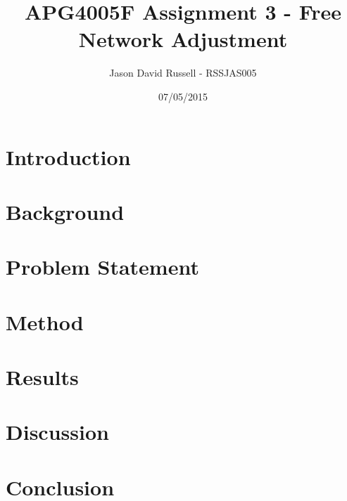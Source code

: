 \documentclass{article}
\title{APG4005F Assignment 3 - Free Network Adjustment}
\date{07/05/2015}
\author{Jason David Russell - RSSJAS005}
\begin{document}
\maketitle
{}

\newpage
\tableofcontents


\newpage
\section{Introduction}


\section{Background}

\section{Problem Statement}

\section{Method}

\section{Results}

\section{Discussion}

\section{Conclusion}
\end{document}

